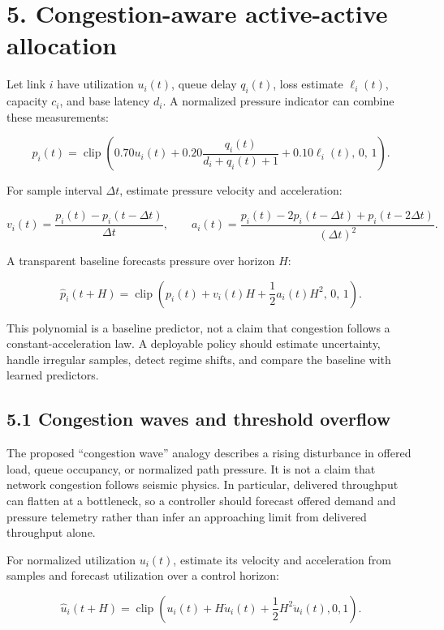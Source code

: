 \documentclass[
  american,
  11pt,
]{article}
\begin{document}
\section{5. Congestion-aware active-active
allocation}\label{congestion-aware-active-active-allocation}

Let link \(i\) have utilization \(u_i(t)\), queue delay \(q_i(t)\), loss
estimate \(\ell_i(t)\), capacity \(c_i\), and base latency \(d_i\). A
normalized pressure indicator can combine these measurements:

\[p_i(t)=\operatorname{clip}\left(
0.70u_i(t)+0.20\frac{q_i(t)}{d_i+q_i(t)+1}
+0.10\ell_i(t),\,0,\,1\right).\]

For sample interval \(\Delta t\), estimate pressure velocity and
acceleration:

\[v_i(t)=\frac{p_i(t)-p_i(t-\Delta t)}{\Delta t},\qquad
a_i(t)=\frac{p_i(t)-2p_i(t-\Delta t)+p_i(t-2\Delta t)}{(\Delta t)^2}.\]

A transparent baseline forecasts pressure over horizon \(H\):

\[\hat p_i(t+H)=\operatorname{clip}\left(
p_i(t)+v_i(t)H+\frac{1}{2}a_i(t)H^2,\,0,\,1\right).\]

This polynomial is a baseline predictor, not a claim that congestion
follows a constant-acceleration law. A deployable policy should estimate
uncertainty, handle irregular samples, detect regime shifts, and compare
the baseline with learned predictors.

\subsection{5.1 Congestion waves and threshold
overflow}\label{congestion-waves-and-threshold-overflow}

The proposed ``congestion wave'' analogy describes a rising disturbance
in offered load, queue occupancy, or normalized path pressure. It is not
a claim that network congestion follows seismic physics. In particular,
delivered throughput can flatten at a bottleneck, so a controller should
forecast offered demand and pressure telemetry rather than infer an
approaching limit from delivered throughput alone.

For normalized utilization \(u_i(t)\), estimate its velocity and
acceleration from samples and forecast utilization over a control
horizon:

\[\hat{u}_i(t+H)=\operatorname{clip}\left(
u_i(t)+H\dot{u}_i(t)+\frac{1}{2}H^2\ddot{u}_i(t),0,1\right).\]
\end{document}
